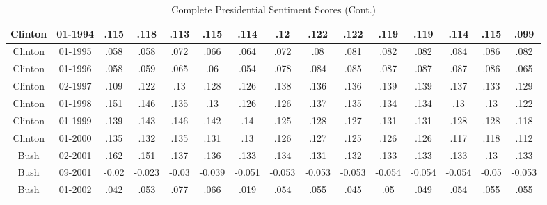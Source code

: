 \begin{sidewaystable}
\begin{singlespace}
\begin{center}
\begin{tabular}{||c c c c c c c c c c c c c c c||}
\hline
Clinton & 01-1994 & .115 & .118 & .113 & .115 & .114 & .12 & .122 & .122 & .119 & .119 & .114 & .115 & .099 \\ 
\hline
Clinton & 01-1995 & .058 & .058 & .072 & .066 & .064 & .072 & .08 & .081 & .082 & .082 & .084 & .086 & .082 \\ 
\hline
Clinton & 01-1996 & .058 & .059 & .065 & .06 & .054 & .078 & .084 & .085 & .087 & .087 & .087 & .086 & .065 \\ 
\hline
Clinton & 02-1997 & .109 & .122 & .13 & .128 & .126 & .138 & .136 & .136 & .139 & .139 & .137 & .133 & .129 \\ 
\hline
Clinton & 01-1998 & .151 & .146 & .135 & .13 & .126 & .126 & .137 & .135 & .134 & .134 & .13 & .13 & .122 \\ 
\hline
Clinton & 01-1999 & .139 & .143 & .146 & .142 & .14 & .125 & .128 & .127 & .131 & .131 & .128 & .128 & .118 \\ 
\hline
Clinton & 01-2000 & .135 & .132 & .135 & .131 & .13 & .126 & .127 & .125 & .126 & .126 & .117 & .118 & .112 \\ 
\hline
Bush & 02-2001 & .162 & .151 & .137 & .136 & .133 & .134 & .131 & .132 & .133 & .133 & .133 & .13 & .133 \\ 
\hline
Bush & 09-2001 & -0.02 & -0.023 & -0.03 & -0.039 & -0.051 & -0.053 & -0.053 & -0.053 & -0.054 & -0.054 & -0.054 & -0.05 & -0.053 \\ 
\hline
Bush & 01-2002 & .042 & .053 & .077 & .066 & .019 & .054 & .055 & .045 & .05 & .049 & .054 & .055 & .055 \\ 
\hline
 \hline
 \end{tabular}
\end{center}
\caption{Complete Presidential Sentiment Scores (Cont.)}
\label{appendix:sent9}
\end{singlespace}
\end{sidewaystable}

